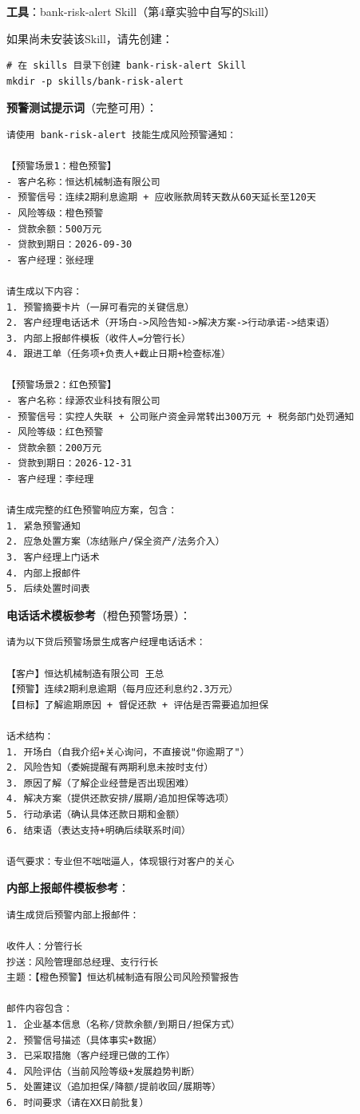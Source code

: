 \begin{practicebox}[实操：贷后风险预警话术生成]
\textbf{工具}：bank-risk-alert Skill（第4章实验中自写的Skill）

如果尚未安装该Skill，请先创建：

\begin{lstlisting}[style=shell]
# 在 skills 目录下创建 bank-risk-alert Skill
mkdir -p skills/bank-risk-alert
\end{lstlisting}

\textbf{预警测试提示词}（完整可用）：

\begin{lstlisting}
请使用 bank-risk-alert 技能生成风险预警通知：

【预警场景1：橙色预警】
- 客户名称：恒达机械制造有限公司
- 预警信号：连续2期利息逾期 + 应收账款周转天数从60天延长至120天
- 风险等级：橙色预警
- 贷款余额：500万元
- 贷款到期日：2026-09-30
- 客户经理：张经理

请生成以下内容：
1. 预警摘要卡片（一屏可看完的关键信息）
2. 客户经理电话话术（开场白->风险告知->解决方案->行动承诺->结束语）
3. 内部上报邮件模板（收件人=分管行长）
4. 跟进工单（任务项+负责人+截止日期+检查标准）

【预警场景2：红色预警】
- 客户名称：绿源农业科技有限公司
- 预警信号：实控人失联 + 公司账户资金异常转出300万元 + 税务部门处罚通知
- 风险等级：红色预警
- 贷款余额：200万元
- 贷款到期日：2026-12-31
- 客户经理：李经理

请生成完整的红色预警响应方案，包含：
1. 紧急预警通知
2. 应急处置方案（冻结账户/保全资产/法务介入）
3. 客户经理上门话术
4. 内部上报邮件
5. 后续处置时间表
\end{lstlisting}

\textbf{电话话术模板参考}（橙色预警场景）：

\begin{lstlisting}
请为以下贷后预警场景生成客户经理电话话术：

【客户】恒达机械制造有限公司 王总
【预警】连续2期利息逾期（每月应还利息约2.3万元）
【目标】了解逾期原因 + 督促还款 + 评估是否需要追加担保

话术结构：
1. 开场白（自我介绍+关心询问，不直接说"你逾期了"）
2. 风险告知（委婉提醒有两期利息未按时支付）
3. 原因了解（了解企业经营是否出现困难）
4. 解决方案（提供还款安排/展期/追加担保等选项）
5. 行动承诺（确认具体还款日期和金额）
6. 结束语（表达支持+明确后续联系时间）

语气要求：专业但不咄咄逼人，体现银行对客户的关心
\end{lstlisting}

\textbf{内部上报邮件模板参考}：

\begin{lstlisting}
请生成贷后预警内部上报邮件：

收件人：分管行长
抄送：风险管理部总经理、支行行长
主题：【橙色预警】恒达机械制造有限公司风险预警报告

邮件内容包含：
1. 企业基本信息（名称/贷款余额/到期日/担保方式）
2. 预警信号描述（具体事实+数据）
3. 已采取措施（客户经理已做的工作）
4. 风险评估（当前风险等级+发展趋势判断）
5. 处置建议（追加担保/降额/提前收回/展期等）
6. 时间要求（请在XX日前批复）
\end{lstlisting}
\end{practicebox}


